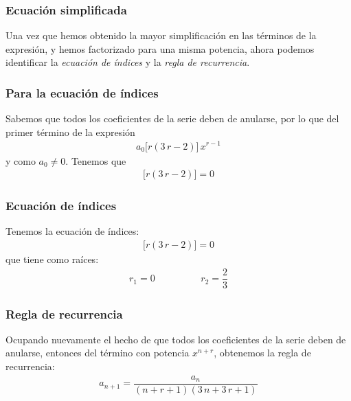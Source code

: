 \begin{frame}
\frametitle{Ecuación simplificada}
Una vez que hemos obtenido la mayor simplificación en las términos de la expresión, y hemos factorizado para una misma potencia, ahora podemos identificar la \emph{ecuación de índices} y la \emph{regla de recurrencia}.
\end{frame}
\begin{frame}
\frametitle{Para la ecuación de índices}
Sabemos que todos los coeficientes de la serie deben de anularse, por lo que del primer término de la expresión
\begin{align*}
a_{0} \big[ r (3 \, r - 2) \big] \, x^{r-1}
\end{align*}
y como $a_{0} \neq 0$.
\pause
Tenemos que
\begin{align*}
\big[ r (3 \, r - 2) \big] = 0
\end{align*}
\end{frame}
\begin{frame}
\frametitle{Ecuación de índices}
Tenemos la ecuación de índices:
\begin{align*}
\big[ r (3 \, r - 2) \big] = 0
\end{align*}
\pause
que tiene como raíces:
\begin{align*}
r_{1} = 0 \hspace{2cm} r_{2} = \dfrac{2}{3}
\end{align*}
\end{frame}
\begin{frame}
\frametitle{Regla de recurrencia}
Ocupando nuevamente el hecho de que todos los coeficientes de la serie deben de anularse, entonces del término con potencia $x^{n+r}$, obtenemos la regla de recurrencia:
\begin{align*}
a_{n+1} = \dfrac{a_{n}}{(n + r + 1)(3 \, n+ 3 \, r + 1)}
\end{align*}
\end{frame}
